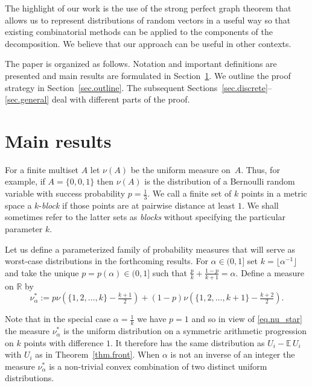 \documentclass{article}
\def\E{{\mathbb E}\,}
\newcommand\nuopt[1]{\nu_{#1}^*}
\begin{document}
The highlight of our work is the use of the strong perfect graph theorem that allows us to represent distributions of random vectors in a useful way so that existing combinatorial methods can be applied to the components of the decomposition. We believe that our approach can be useful in other contexts.

The paper is organized as follows. Notation and important definitions are presented and main results are formulated in Section~\ref{sec.results}. We outline the proof strategy in Section~\ref{sec.outline}. The subsequent Sections~\ref{sec.discrete}--\ref{sec.general} deal with different parts of the proof. 


\section{Main results}
\label{sec.results}

For a finite multiset $A$ let $\nu(A)$ be the uniform measure on~$A$. Thus, for example, if $A=\{0,0,1\}$ then $\nu(A)$ is the distribution of a Bernoulli random variable with success probability $p=\frac{1}{3}$. We call a finite set of $k$ points in a metric space a $k$-\emph{block} if those points are at pairwise distance at least $1$. We shall sometimes refer to the latter sets as \emph{blocks} without specifying the particular parameter $k$. 



Let us define a parameterized family of probability measures that will serve as worst-case distributions in the forthcoming results. For $\alpha \in (0,1]$ set $k=\lfloor \alpha^{-1} \rfloor$ and take the unique $p=p(\alpha) \in (0,1]$
such that $\frac p k + \frac {1-p} {k+1} = \alpha$. Define a  measure on $\mathbb{R}$ by
\begin{equation}\label{eq.nu_star}
    \nuopt \alpha :=  p \nu(\{1,2,\dots,k\} - \tfrac {k+1} 2) + (1-p) \nu(\{1,2,\dots, k+1\} - \tfrac {k+2} 2).
\end{equation}

Note that in the special case $\alpha=\frac{1}{k}$ we have $p=1$ and so in view of \eqref{eq.nu_star} the measure $\nuopt \alpha$ is the uniform distribution on a symmetric arithmetic progression on $k$ points with difference $1$. It therefore has the same distribution as $U_i-\E U_i$ with $U_i$ as in Theorem~\ref{thm.front}. When $\alpha$ is not an inverse of an integer the measure $\nu^*_\alpha$ is a non-trivial convex combination of two distinct uniform distributions.
\end{document}
